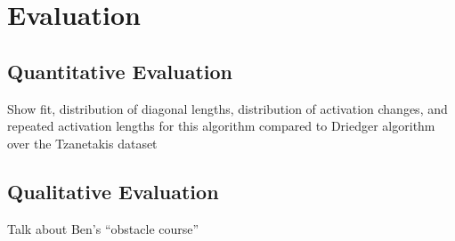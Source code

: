 \documentclass{article}
\begin{document}
\section{Evaluation}

\subsection{Quantitative Evaluation}
Show fit, distribution of diagonal lengths, distribution of activation changes, and repeated activation lengths for this algorithm compared to Driedger algorithm over the Tzanetakis dataset


\subsection{Qualitative Evaluation}

Talk about Ben's ``obstacle course''



%
%
%
%
%
\end{document}

